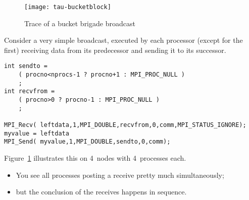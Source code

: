 \begin{figure}[ht]
\texttt{[image: tau-bucketblock]}
\caption{Trace of a bucket brigade broadcast}
\label{fig:tau-bucketblock}
\end{figure}


Consider a very simple broadcast, executed by each processor (except for the first)
receiving data from its predecessor and sending it to its successor.
\begin{lstlisting}
int sendto =
    ( procno<nprocs-1 ? procno+1 : MPI_PROC_NULL )
    ;
int recvfrom =
    ( procno>0 ? procno-1 : MPI_PROC_NULL )
    ;

MPI_Recv( leftdata,1,MPI_DOUBLE,recvfrom,0,comm,MPI_STATUS_IGNORE);
myvalue = leftdata
MPI_Send( myvalue,1,MPI_DOUBLE,sendto,0,comm);
\end{lstlisting}

Figure~\ref{fig:tau-bucketblock} illustrates this on 4~nodes with 4~processes each.
\begin{itemize}
\item You see all processes posting a receive pretty much simultaneously;
\item but the conclusion of the receives happens in sequence.
\end{itemize}

